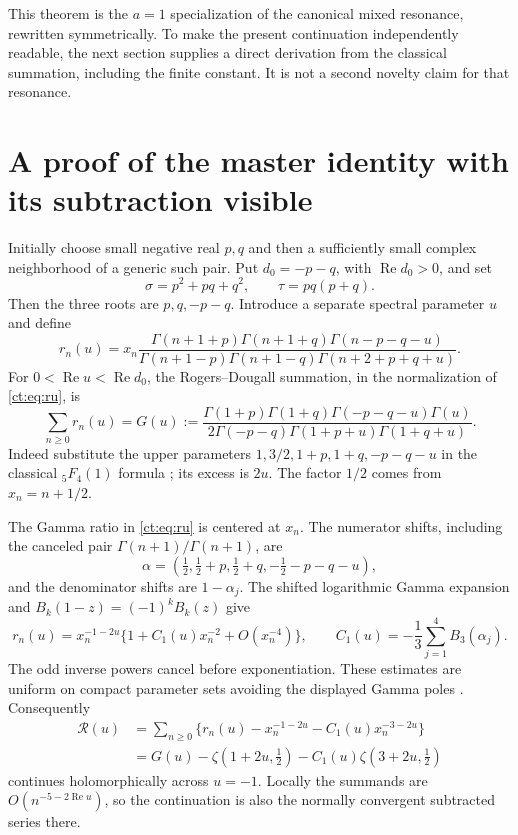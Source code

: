 \documentclass[11pt]{article}
\numberwithin{equation}{section}
\theoremstyle{definition}\newtheorem{definition}[theorem]{Definition}
\theoremstyle{remark}\newtheorem{remark}[theorem]{Remark}
\DeclareMathOperator{\Rea}{Re}
\begin{document}
This theorem is the $a=1$ specialization of the canonical mixed resonance,
rewritten symmetrically. To make the present continuation independently
readable, the next section supplies a direct derivation from the classical
summation, including the finite constant. It is not a second novelty claim
for that resonance.

\section{A proof of the master identity with its subtraction visible}
\label{ct:sec:master-proof}
Initially choose small negative real $p,q$ and then a sufficiently small
complex neighborhood of a generic such pair. Put $d_0=-p-q$, with
$\Rea d_0>0$, and set
\[
 \sigma=p^2+pq+q^2,\qquad \tau=pq(p+q).
\]
Then the three roots are $p,q,-p-q$. Introduce a separate spectral parameter
$u$ and define
\begin{equation}\label{ct:eq:ru}
 r_n(u)=x_n\frac{\Gamma(n+1+p)\Gamma(n+1+q)\Gamma(n-p-q-u)}
 {\Gamma(n+1-p)\Gamma(n+1-q)\Gamma(n+2+p+q+u)}.
\end{equation}
For $0<\Rea u<\Rea d_0$, the Rogers--Dougall summation, in the normalization of
\eqref{ct:eq:ru}, is
\begin{equation}\label{ct:eq:G}
 \sum_{n\ge0}r_n(u)=G(u):=
 \frac{\Gamma(1+p)\Gamma(1+q)\Gamma(-p-q-u)\Gamma(u)}
 {2\Gamma(-p-q)\Gamma(1+p+u)\Gamma(1+q+u)}.
\end{equation}
Indeed substitute the upper parameters
$1,3/2,1+p,1+q,-p-q-u$ in the classical ${}_5F_4(1)$ formula
\cite[Eq.~16.4.9]{ct:dlmf16}; its excess is $2u$.
The factor $1/2$ comes from $x_n=n+1/2$.

The Gamma ratio in \eqref{ct:eq:ru} is centered at $x_n$. The numerator
shifts, including the canceled pair $\Gamma(n+1)/\Gamma(n+1)$, are
\[
 \alpha=(\tfrac12,\tfrac12+p,\tfrac12+q,-\tfrac12-p-q-u),
\]
and the denominator shifts are $1-\alpha_j$. The shifted logarithmic
Gamma expansion and $B_k(1-z)=(-1)^kB_k(z)$ give
\begin{equation}\label{ct:eq:asymptotic-r}
 r_n(u)=x_n^{-1-2u}\{1+C_1(u)x_n^{-2}+O(x_n^{-4})\},
 \qquad C_1(u)=-\frac13\sum_{j=1}^4B_3(\alpha_j).
\end{equation}
The odd inverse powers cancel before exponentiation. These estimates are
uniform on compact parameter sets avoiding the displayed Gamma poles
\cite{ct:dlmf5}. Consequently
\begin{align}
 \mathcal R(u)&=\sum_{n\ge0}
 \{r_n(u)-x_n^{-1-2u}-C_1(u)x_n^{-3-2u}\}\\
 &=G(u)-\zeta(1+2u,\tfrac12)-C_1(u)\zeta(3+2u,\tfrac12)
 \label{ct:eq:R-cont}
\end{align}
continues holomorphically across $u=-1$. Locally the summands are
$O(n^{-5-2\Rea u})$, so the continuation is also the normally convergent
subtracted series there.
\end{document}
